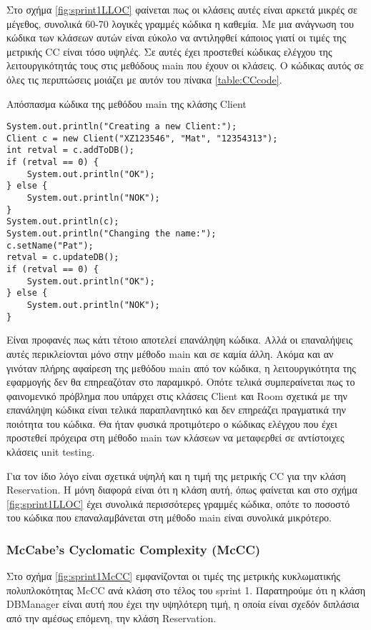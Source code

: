 Στο σχήμα \ref{fig:sprint1LLOC} φαίνεται πως οι κλάσεις αυτές είναι
αρκετά μικρές σε μέγεθος, συνολικά 60-70 λογικές γραμμές
κώδικα η καθεμία. Με μια ανάγνωση του κώδικα των κλάσεων αυτών είναι
εύκολο να αντιληφθεί κάποιος γιατί οι τιμές της μετρικής CC είναι τόσο
υψηλές. Σε αυτές έχει προστεθεί κώδικας ελέγχου της λειτουργικότητάς
τους στις μεθόδους main που έχουν οι κλάσεις. Ο κώδικας αυτός σε όλες
τις περιπτώσεις μοιάζει με αυτόν του πίνακα \ref{table:CCcode}.

\begin{table}
\caption{Απόσπασμα κώδικα της μεθόδου main της κλάσης Client}
\label{table:CCcode}
\begin{lstlisting}
System.out.println("Creating a new Client:");
Client c = new Client("XZ123546", "Mat", "12354313");
int retval = c.addToDB();
if (retval == 0) {
	System.out.println("OK");
} else {
	System.out.println("NOK");
}
System.out.println(c);
System.out.println("Changing the name:");
c.setName("Pat");
retval = c.updateDB();
if (retval == 0) {
	System.out.println("OK");
} else {
	System.out.println("NOK");
}
\end{lstlisting}
\end{table}

Είναι προφανές πως κάτι τέτοιο αποτελεί επανάληψη κώδικα. Αλλά οι επαναλήψεις
αυτές περικλείονται μόνο στην μέθοδο main και σε καμία άλλη. Ακόμα και
αν γινόταν πλήρης αφαίρεση της μεθόδου main από τον κώδικα, η
λειτουργικότητα της εφαρμογής δεν θα επηρεαζόταν στο παραμικρό. Οπότε
τελικά συμπεραίνεται πως το φαινομενικό πρόβλημα που υπάρχει στις
κλάσεις Client και Room σχετικά με την επανάληψη κώδικα είναι τελικά
παραπλανητικό και δεν επηρεάζει πραγματικά την ποιότητα του κώδικα. Θα
ήταν φυσικά προτιμότερο ο κώδικας ελέγχου που έχει προστεθεί πρόχειρα
στη μέθοδο main των κλάσεων να μεταφερθεί σε αντίστοιχες κλάσεις unit
testing.

Για τον ίδιο λόγο είναι σχετικά υψηλή και η τιμή της μετρικής CC για την
κλάση Reservation. Η μόνη διαφορά είναι ότι η κλάση αυτή, όπως φαίνεται
και στο σχήμα \ref{fig:sprint1LLOC} έχει συνολικά περισσότερες γραμμές
κώδικα, οπότε το ποσοστό του κώδικα που επαναλαμβάνεται στη μέθοδο main
είναι συνολικά μικρότερο.

\subsubsection{McCabe’s Cyclomatic Complexity (McCC)}
\label{section:sprint1McCC}

Στο σχήμα \ref{fig:sprint1McCC} εμφανίζονται οι τιμές της μετρικής
κυκλωματικής πολυπλοκότητας McCC ανά κλάση στο τέλος του sprint 1.
Παρατηρούμε ότι η κλάση DBManager είναι αυτή που έχει την υψηλότερη
τιμή, η οποία είναι σχεδόν διπλάσια από την αμέσως επόμενη, την κλάση
Reservation.

